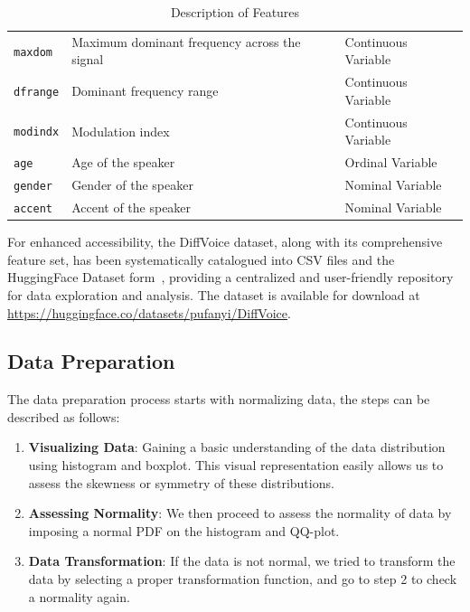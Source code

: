 \documentclass{article}
\begin{document}
{\begin{table}
\begin{tabular}{lll}
				\texttt{maxdom} & Maximum dominant frequency across the signal & Continuous Variable \\
				\texttt{dfrange} & Dominant frequency range & Continuous Variable \\
				\texttt{modindx} & Modulation index & Continuous Variable \\
				\texttt{age} & Age of the speaker & Ordinal Variable \\
				\texttt{gender} & Gender of the speaker & Nominal Variable \\
				\texttt{accent} & Accent of the speaker & Nominal Variable \\
				\hline
			\end{tabular}
			\caption{Description of Features}
			\label{table:features_description}
		\end{table}
	}
	
	For enhanced accessibility, the DiffVoice dataset, along with its comprehensive feature set, has been systematically catalogued into CSV files and the HuggingFace Dataset form~\cite{lhoest2021datasets}, providing a centralized and user-friendly repository for data exploration and analysis. The dataset is available for download at \url{https://huggingface.co/datasets/pufanyi/DiffVoice}.	
	
	\subsection{Data Preparation}
	
	The data preparation process starts with normalizing data, the steps can be described as follows:
	
	\begin{enumerate}
		\item \textbf{Visualizing Data}: Gaining a basic understanding of the data distribution using histogram and boxplot. This visual representation easily allows us to assess the skewness or symmetry of these distributions.
		\item \textbf{Assessing Normality}: We then proceed to assess the normality of data by imposing a normal PDF on the histogram and QQ-plot.
		\item \textbf{Data Transformation}: If the data is not normal, we tried to transform the data by selecting a proper transformation function, and go to step 2 to check a normality again.
	\end{enumerate}
	
\end{document}
